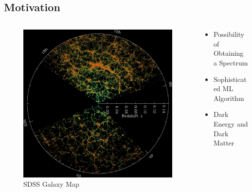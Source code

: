 \documentclass{beamer}
\begin{document}
\subsection{Motivation}
\begin{frame}
    \begin{columns}[onlytextwidth]
    \begin{column}{.45\textwidth}
        \begin{figure}
            \includegraphics[width=\textwidth]{img/sdss_galaxy_map.jpg}
            \caption*{SDSS Galaxy Map}
        \end{figure}
    \end{column}
    \hfill
    \begin{column}{.45\textwidth}
    \begin{itemize}
        \item Possibility of Obtaining a Spectrum
        \item Sophisticated ML Algorithm
        \item Dark Energy and Dark Matter
    \end{itemize}
    \end{column}
    \end{columns}
    \end{frame}
\end{document}

